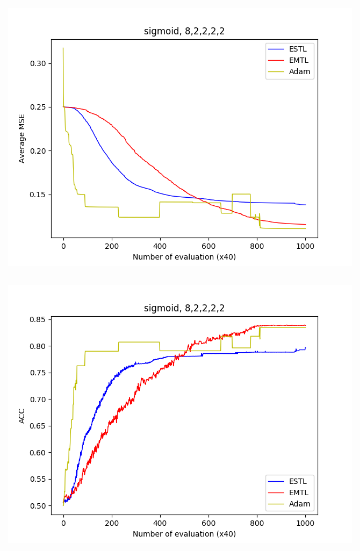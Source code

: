 \documentclass[conference]{IEEEtran}
\theoremstyle{definition}
\begin{document}
\begin{figure}
      \begin{subfigure}{0.48\linewidth}
        \centering
        \includegraphics[width=1.0\linewidth]{images/sigmoid/avg_mse8,2,2,2,2.png}
      \end{subfigure}
      \begin{subfigure}{0.48\linewidth}
        \centering
        \includegraphics[width=1.0\linewidth]{images/sigmoid/avg_acc8,2,2,2,2.png}
      \end{subfigure}


\end{figure}
\end{document}
